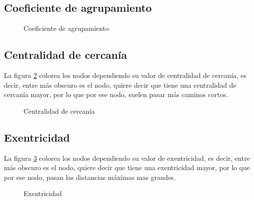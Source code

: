 \documentclass[a4paper, 11pt]{article}
\begin{document}
\subsection*{Coeficiente de agrupamiento}

\begin{figure}[H]
\centering
\subfigure[Grafo 1]{\texttt{[image: ./a2g1]}}
\subfigure[Grafo 2]{\texttt{[image: ./a2g2]}}
\subfigure[Grafo 3]{\texttt{[image: ./a2g3]}}
\subfigure[Grafo 4]{\texttt{[image: ./a2g4]}}
\subfigure[Grafo 5]{\texttt{[image: ./a2g5]}}
\caption{Coeficiente de agrupamiento}
\label{figure3}
\end{figure}

\subsection*{Centralidad de cercanía}
La figura \ref{figure4} colorea los nodos dependiendo su valor de centralidad de cercanía, es decir, entre más obscuro es el nodo, quiere decir que tiene una centralidad de cercanía mayor, por lo que por ese nodo, suelen pasar más caminos cortos.

\begin{figure}[H]
\centering
\subfigure[Grafo 1]{\texttt{[image: ./a3g1]}}
\subfigure[Grafo 2]{\texttt{[image: ./a3g2]}}
\subfigure[Grafo 3]{\texttt{[image: ./a3g3]}}
\subfigure[Grafo 4]{\texttt{[image: ./a3g4]}}
\subfigure[Grafo 5]{\texttt{[image: ./a3g5]}}
\caption{Centralidad de cercanía}
\label{figure4}
\end{figure}

\subsection*{Exentricidad}
La figura \ref{figure5} colorea los nodos dependiendo su valor de exentricidad, es decir, entre más obscuro es el nodo, quiere decir que tiene una exentricidad mayor, por lo que por ese nodo, pasan las distancias máximas mas grandes.

\begin{figure}[H]
\centering
\subfigure[Grafo 1]{\texttt{[image: ./a5g1]}}
\subfigure[Grafo 2]{\texttt{[image: ./a5g2]}}
\subfigure[Grafo 3]{\texttt{[image: ./a5g3]}}
\subfigure[Grafo 4]{\texttt{[image: ./a5g4]}}
\subfigure[Grafo 5]{\texttt{[image: ./a5g5]}}
\caption{Exentricidad}
\label{figure5}
\end{figure}
\end{document}
